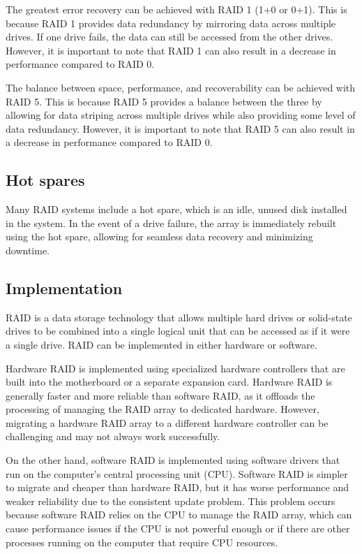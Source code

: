 The greatest error recovery can be achieved with RAID 1 (1+0 or 0+1). This is because RAID 1 provides data redundancy by mirroring data across multiple drives. 
If one drive fails, the data can still be accessed from the other drives. 
However, it is important to note that RAID 1 can also result in a decrease in performance compared to RAID 0.

The balance between space, performance, and recoverability can be achieved with RAID 5. 
This is because RAID 5 provides a balance between the three by allowing for data striping across multiple drives while also providing some level of data redundancy. 
However, it is important to note that RAID 5 can also result in a decrease in performance compared to RAID 0.

\subsection{Hot spares}
Many RAID systems include a hot spare, which is an idle, unused disk installed in the system.
In the event of a drive failure, the array is immediately rebuilt using the hot spare, allowing for seamless data recovery and minimizing downtime.

\subsection{Implementation}
RAID is a data storage technology that allows multiple hard drives or solid-state drives to be combined into a single logical unit that can be accessed as if it were a single drive. 
RAID can be implemented in either hardware or software.

Hardware RAID is implemented using specialized hardware controllers that are built into the motherboard or a separate expansion card. 
Hardware RAID is generally faster and more reliable than software RAID, as it offloads the processing of managing the RAID array to dedicated hardware. 
However, migrating a hardware RAID array to a different hardware controller can be challenging and may not always work successfully.

On the other hand, software RAID is implemented using software drivers that run on the computer's central processing unit (CPU). 
Software RAID is simpler to migrate and cheaper than hardware RAID, but it has worse performance and weaker reliability due to the consistent update problem. 
This problem occurs because software RAID relies on the CPU to manage the RAID array, which can cause performance issues if the CPU is not powerful enough or if there are other processes running on the computer that require CPU resources.



